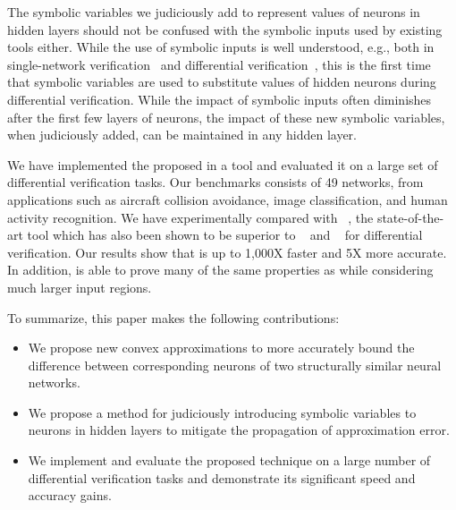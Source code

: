 The symbolic variables we judiciously add to represent values of
neurons in hidden layers should not be confused with the symbolic
inputs used by existing tools either.
%
While the use of symbolic inputs is well understood, e.g., both in
single-network verification~\cite{SinghGPV19, Singh2019krelu,
WangPWYJ18nips, zhang2018efficient} and differential
verification~\cite{PaulsenWW20}, this is the first time that symbolic
variables are used to substitute values of hidden neurons during
differential verification.
%
While the impact of symbolic inputs often diminishes after the first
few layers of neurons, the impact of these new symbolic variables,
when judiciously added, can be maintained in any hidden layer.


We have implemented the proposed \Name{} in a tool and evaluated it on
a large set of differential verification tasks. Our benchmarks
consists of 49 networks, from applications such as aircraft collision
avoidance, image classification, and human activity recognition.  We
have experimentally compared with \ReluDiff{}~\cite{PaulsenWW20}, the
state-of-the-art tool which has also been shown to be superior to
\ReluVal{}~\cite{WangPWYJ18} and \DeepPoly{}~\cite{SinghGPV19} for differential
verification.
%
Our results show that \Name{} is up to 1,000X faster and 5X more
accurate.  In addition, \Name{} is able to prove many of the same properties
as \ReluDiff{} while considering much larger input regions.


To summarize, this paper makes the following contributions:
\begin{itemize}
\item
We propose new convex approximations to more accurately bound the
difference between corresponding neurons of two structurally similar
neural networks.
\item
We propose a method for judiciously introducing symbolic variables to
neurons in hidden layers to mitigate the propagation of approximation
error.
\item
We implement and evaluate the proposed technique on a large number of
differential verification tasks and demonstrate its significant speed
and accuracy gains.
\end{itemize}


